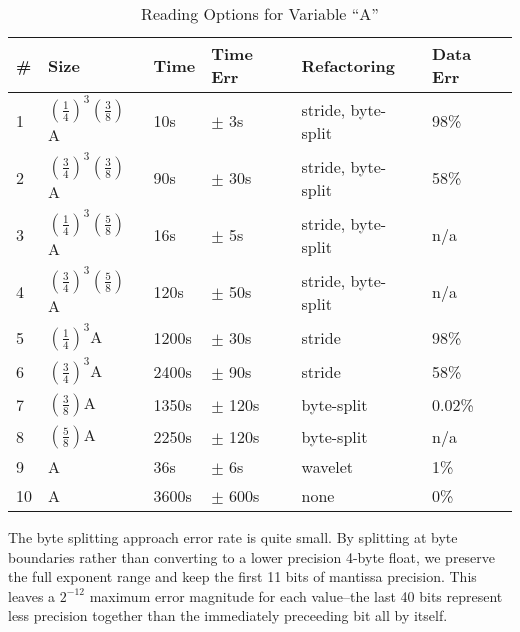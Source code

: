\documentclass[letterpaper,twocolumn,10pt]{article}
\begin{document}
\begin{table}[tbp]
\centering
\caption{Reading Options for Variable ``A''}
\label{tab:results}
\begin{tabular}{|l|l|l|l|l|l|}
\hline
\# & Size & Time & Time Err & Refactoring & Data Err\\
\hline
1 & $(\frac{1}{4})^3(\frac{3}{8})$A & 10s & $\pm$ 3s & stride, byte-split & 98\% \\
\hline
2 & $(\frac{3}{4})^3(\frac{3}{8})$A & 90s & $\pm$ 30s & stride, byte-split & 58\% \\
\hline
3 & $(\frac{1}{4})^3(\frac{5}{8})$A & 16s & $\pm$ 5s & stride, byte-split & n/a \\
\hline
4 & $(\frac{3}{4})^3(\frac{5}{8})$A & 120s & $\pm$ 50s & stride, byte-split & n/a \\
\hline
\hline
5 & $(\frac{1}{4})^3$A & 1200s & $\pm$ 30s & stride & 98\% \\
\hline
6 & $(\frac{3}{4})^3$A & 2400s & $\pm$ 90s & stride & 58\% \\
\hline
\hline
7 & $(\frac{3}{8})$A & 1350s & $\pm$ 120s & byte-split & 0.02\% \\
\hline
8 & $(\frac{5}{8})$A & 2250s & $\pm$ 120s & byte-split & n/a \\
\hline
\hline
9 & A & 36s & $\pm$ 6s & wavelet & 1\% \\
\hline
\hline
10 & A & 3600s & $\pm$ 600s & none & 0\% \\
\hline
\end{tabular}
\end{table}

The byte splitting approach error rate is quite small. By splitting at byte
boundaries rather than converting to a lower precision 4-byte float, we
preserve the full exponent range and keep the first 11 bits of mantissa
precision. This leaves a $2^{-12}$ maximum error magnitude for each value--the
last 40 bits represent less precision together than the immediately preceeding
bit all by itself.
\end{document}
